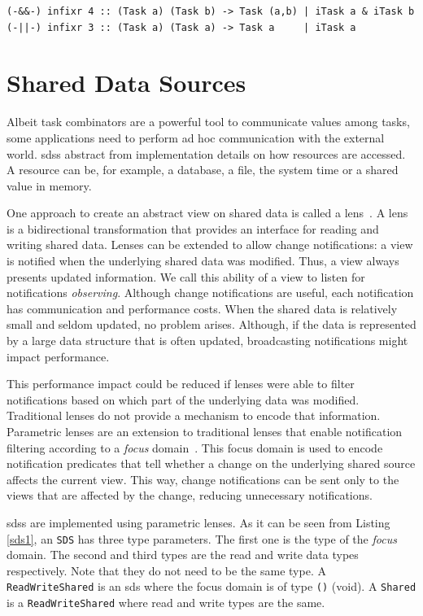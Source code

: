 \begin{lstlisting}[caption=Parallel combinators,label=par_comb,captionpos=b]
(-&&-) infixr 4 :: (Task a) (Task b) -> Task (a,b) | iTask a & iTask b
(-||-) infixr 3 :: (Task a) (Task a) -> Task a     | iTask a
\end{lstlisting}


\section{Shared Data Sources}

Albeit task combinators are a powerful tool to 
communicate values among tasks, some applications need to perform ad hoc communication with the external world. \acp{sds} abstract from implementation details on how resources are accessed. A resource can be, for example, a database, a file, the system time or a shared value in memory. 

One approach to create an abstract view on shared data is called a lens~\cite{lenses}. A lens is a bidirectional transformation that provides an interface for reading and writing shared data. Lenses can be extended to allow change notifications: a view is notified when the underlying shared data was modified. Thus, a view always presents updated information. We call this ability of a view to listen for notifications \textit{observing}. Although change notifications are useful, each notification has communication and performance costs. When the shared data is relatively small and seldom updated, no problem arises. Although, if the data is represented by a large data structure that is often updated, broadcasting notifications might impact performance. 

This performance impact could be reduced if lenses were able to filter notifications based on which part of the underlying data was modified. Traditional lenses do not provide a mechanism to encode that information. Parametric lenses are an extension to traditional lenses that enable notification filtering according to a \textit{focus} domain~\cite{parametric}. This focus domain is used to encode notification predicates that tell whether a change on the underlying shared source affects the current view. This way, change notifications can be sent only to the views that are affected by the change, reducing unnecessary notifications.

\acp{sds} are implemented using parametric lenses. As it can be seen from Listing \ref{sds1}, an \texttt{SDS} has three type parameters. The first one is the type of the \textit{focus} domain. The second and third types are the read and write data types respectively. Note that they do not need to be the same type. A \texttt{ReadWriteShared} is an \ac{sds} where the focus domain is of type \texttt{()} (void). A \texttt{Shared} is a \texttt{ReadWriteShared} where read and write types are the same.

